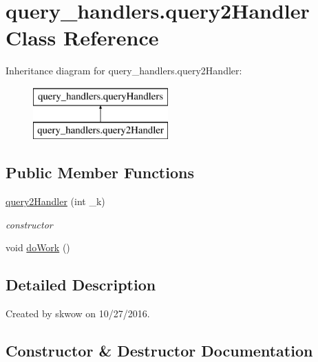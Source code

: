 \hypertarget{classquery__handlers_1_1query2_handler}{}\section{query\+\_\+handlers.\+query2\+Handler Class Reference}
\label{classquery__handlers_1_1query2_handler}
Inheritance diagram for query\+\_\+handlers.\+query2\+Handler\+:\begin{figure}[H]
\begin{center}
\leavevmode
\includegraphics[height=2.000000cm]{classquery__handlers_1_1query2_handler}
\end{center}
\end{figure}
\subsection*{Public Member Functions}
\begin{DoxyCompactItemize}
\item 
\hyperlink{classquery__handlers_1_1query2_handler_a76beaa307feebaddfb1c0bc45432b3b8}{query2\+Handler} (int \+\_\+k)
\begin{DoxyCompactList}\small\item\em constructor \end{DoxyCompactList}\item 
void \hyperlink{classquery__handlers_1_1query2_handler_aea6272ec7e1d5c8806f95120c64f2d8c}{do\+Work} ()
\end{DoxyCompactItemize}


\subsection{Detailed Description}
Created by skwow on 10/27/2016. 

\subsection{Constructor \& Destructor Documentation}
\hypertarget{classquery__handlers_1_1query2_handler_a76beaa307feebaddfb1c0bc45432b3b8}{}\label{classquery__handlers_1_1query2_handler_a76beaa307feebaddfb1c0bc45432b3b8} 
